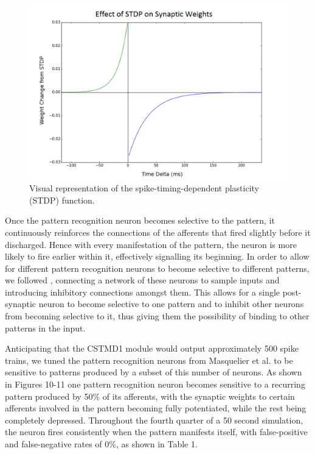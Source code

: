 \documentclass[a4paper,11pt]{article}
\begin{document}
\begin{figure}[H]
\centering
\includegraphics[scale = 0.35]{stdp}
\caption{Visual representation of the spike-timing-dependent plasticity (STDP) function.}
\end{figure}


	Once the pattern recognition neuron becomes selective to the pattern, it continuously reinforces the connections of the afferents that fired slightly before it discharged. Hence with every manifestation of the pattern, the neuron is more likely to fire earlier within it, effectively signalling its beginning. In order to allow for different pattern recognition neurons to become selective to different patterns, we followed \cite{stdp2}, connecting a network of these neurons to sample inputs and introducing inhibitory connections amongst them. This allows for a single post-synaptic neuron to become selective to one pattern and to inhibit other neurons from becoming selective to it, thus giving them the possibility of binding to other patterns in the input.\par

Anticipating that the CSTMD1 module would output approximately 500 spike trains, we tuned the pattern recognition neurons from Masquelier et al. to be sensitive to patterns produced by a subset of this number of neurons. As shown in Figures 10-11 one pattern recognition neuron becomes sensitive to a recurring pattern produced by 50\% of its afferents, with the synaptic weights to certain afferents involved in the pattern becoming fully potentiated, while the rest being completely depressed. Throughout the fourth quarter of a 50 second simulation, the neuron fires consistently when the pattern manifests itself, with false-positive and false-negative rates of 0\%, as shown in Table 1.
\end{document}
